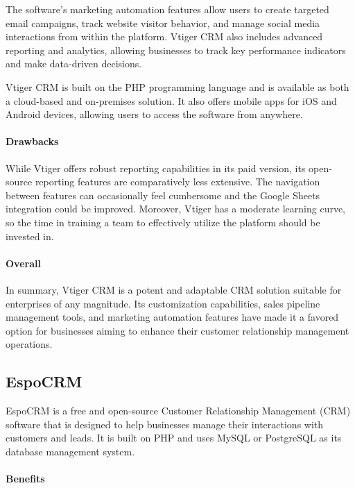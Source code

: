 \documentclass{article}
\begin{document}
The software's marketing automation features allow users to create targeted email campaigns, track website visitor behavior, and manage social media interactions from within the platform. Vtiger CRM also includes advanced reporting and analytics, allowing businesses to track key performance indicators and make data-driven decisions.

Vtiger CRM is built on the PHP programming language and is available as both a cloud-based and on-premises solution. It also offers mobile apps for iOS and Android devices, allowing users to access the software from anywhere.

\paragraph{Drawbacks}

While Vtiger offers robust reporting capabilities in its paid version, its open-source reporting features are comparatively less extensive. The navigation between features can occasionally feel cumbersome and the Google Sheets integration could be improved. Moreover, Vtiger has a moderate learning curve, so the time in training a team to effectively utilize the platform should be invested in.

\paragraph{Overall}

In summary, Vtiger CRM is a potent and adaptable CRM solution suitable for enterprises of any magnitude. Its customization capabilities, sales pipeline management tools, and marketing automation features have made it a favored option for businesses aiming to enhance their customer relationship management operations.

\subsection{EspoCRM}

EspoCRM is a free and open-source Customer Relationship Management (CRM) software that is designed to help businesses manage their interactions with customers and leads. It is built on PHP and uses MySQL or PostgreSQL as its database management system.

\paragraph{Benefits}
\end{document}
